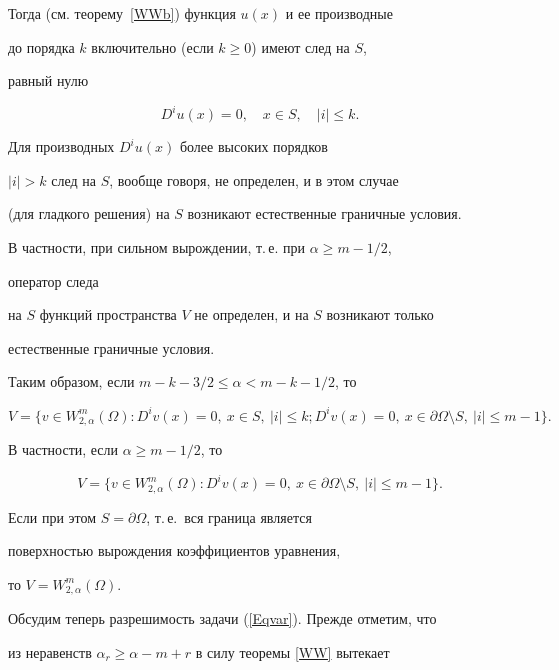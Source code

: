Тогда (см. теорему~\ref{WWb}) функция $u(x)$ и ее производные 


до порядка $k$ включительно (если $k \geq 0$) имеют след на $S$,


равный нулю


$$


D^i u(x) = 0, \quad x \in S, \quad |i| \leq k.


$$


Для производных $D^i u(x)$ более высоких порядков 


$|i| > k$ след на $S$, вообще говоря, не определен, и в этом случае 


(для гладкого решения) на $S$ возникают естественные граничные условия. 


В частности, при сильном вырождении, т.\,е. при $\alpha \geq m-1/2$,


оператор следа


на $S$ функций пространства $V$ не определен, и на $S$ возникают только 


естественные граничные условия.





Таким образом, если $m-k-3/2 \leq \alpha < m-k-1/2$, то


$$


V=\{ v \in W_{2,\alpha}^m(\Omega): D^i v(x)=0,\ x \in S,\ |i| \leq k;


D^i v(x)=0, \ 


x \in \partial \Omega \setminus S,\ |i| \leq m-1 \}. 


$$


В частности, если $\alpha \geq m-1/2$, то


$$


V=\{ v \in W_{2,\alpha}^m(\Omega):


D^i v(x)=0,\ x \in \partial \Omega \setminus S,\ |i| \leq m-1 \}. 


$$


Если при этом $S=\partial \Omega$, т.\,е.~вся граница является 


поверхностью вырождения коэффициентов уравнения,


то $V=W_{2,\alpha}^m(\Omega)$.





Обсудим теперь разрешимость задачи (\ref{Eqvar}). Прежде отметим, что 


из неравенств $\alpha_r \geq \alpha-m+r$ в силу теоремы \ref{WW} вытекает


$$


